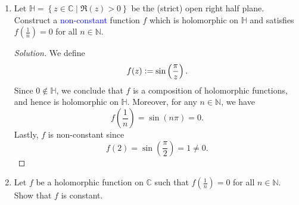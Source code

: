 \documentclass[11pt]{article}
\theoremstyle{definition}
\newenvironment{soln}{\begin{proof}[Solution]}{\end{proof}}
\begin{document}
\begin{enumerate}[leftmargin=*]
\begin{soln}
For the second part, we parameterise the circle as
\[
    \gamma(t) = re^{\iota t} \quad \text{for } t \in [0,2\pi],
\]
where $r > 0$ is arbitrary. We have 
\[
    \gamma^{\prime}(t) = \iota r e^{\iota t} = \iota \gamma(t).
\]
Thus, 
\begin{align*}
    \int_{\gamma} \overline{z}^m \, \mathrm{d}z &= \int_0^{2\pi} \overline{\left( \gamma(t) \right)}^m \cdot \gamma^{\prime}(t) \, \mathrm{d}t \\
    &= \int_0^{2\pi} \overline{\left( \gamma(t) \right)}^{m-1} \cdot \overline{\gamma(t)} \cdot \gamma^{\prime}(t) \, \mathrm{d}t \\
    &= \iota \int_0^{2\pi} \overline{\left( \gamma(t) \right)}^{m-1} \cdot \abs{\gamma(t)}^2 \, \mathrm{d}t \\
    &= \iota r^2 \int_0^{2\pi} r^{m-1} e^{-\iota (m-1)t} \, \mathrm{d}t
\end{align*}
The above integral is $0$ whenever $m \neq 1$. When $m=1$, we have
\[
    \int_0^{2\pi} 1 \, \mathrm{d}t = 2\pi.
\]
Thus, 
\[
    \int_{\gamma} \overline{z}^m \, \mathrm{d}z = \begin{cases}
        2\pi\iota r^2 & m = 1, \\
        0 & m \neq 1.
    \end{cases}
\]
\end{soln}

\item Let $\mathbb{H} = \left\{ z \in \mathbb{C} \mid \mathfrak{R}(z) > 0 \right\}$ be the (strict) open right half plane. Construct a \textcolor{blue}{non-constant} function $f$ which is holomorphic on $\mathbb{H}$ and satisfies $f\left( \frac{1}{n} \right) = 0$ for all $n \in \mathbb{N}$.

\begin{soln}
We define 
\[
    f(z) \vcentcolon= \sin\left( \frac{\pi}{z} \right).
\]
Since $0 \notin \mathbb{H}$, we conclude that $f$ is a composition of holomorphic functions, and hence is holomorphic on $\mathbb{H}$. Moreover, for any $n \in \mathbb{N}$, we have
\[
    f\left( \frac{1}{n} \right) = \sin(n\pi) = 0.
\]
Lastly, $f$ is non-constant since
\[
    f(2) = \sin\left( \frac{\pi}{2} \right) = 1 \neq 0.
\]
\end{soln}

\item Let $f$ be a holomorphic function on $\mathbb{C}$ such that $f\left( \frac{1}{n} \right) = 0$ for all $n \in \mathbb{N}$. Show that $f$ is constant.


\end{enumerate}
\end{document}
